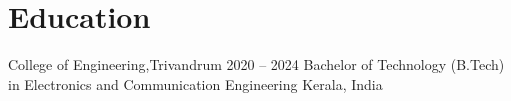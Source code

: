 \section{Education}

\resumeEntry
{College of Engineering,Trivandrum}
{2020 -- 2024}
{Bachelor of Technology (B.Tech) in Electronics and Communication Engineering}
{Kerala, India}